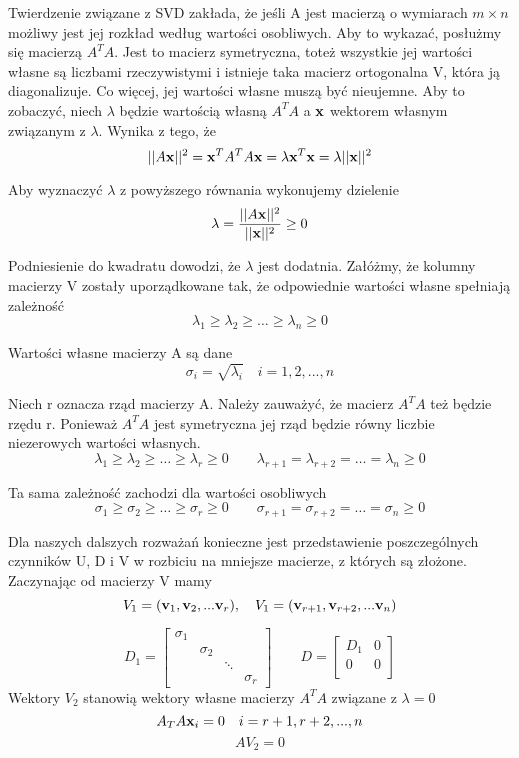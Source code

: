 \documentclass{article}
\begin{document}
Twierdzenie związane z SVD zakłada, że jeśli A jest macierzą o wymiarach $m \times n$ możliwy jest jej rozkład według wartości osobliwych. Aby to wykazać, posłużmy się macierzą $A^T A$. Jest to macierz symetryczna, toteż wszystkie jej wartości własne są liczbami rzeczywistymi i istnieje taka macierz ortogonalna V, która ją diagonalizuje. Co więcej, jej wartości własne muszą być nieujemne. Aby to zobaczyć, niech $\lambda$ będzie wartością własną $A^T A$ a $\vb{x}$ wektorem własnym związanym z $\lambda$. Wynika z tego, że
\[||A \vb{x}||^2 = \vb{x}^{T}A^T A\vb{x} = \lambda\vb{x}^T \vb{x} = \lambda||\vb{x}||^2 \]

Aby wyznaczyć $\lambda$ z powyższego równania wykonujemy dzielenie
\[\lambda = \frac{||A\vb{x}||^2}{||\vb{x}||^2} \geq 0 \]

Podniesienie do kwadratu dowodzi, że $\lambda$ jest dodatnia. Załóżmy, że kolumny macierzy V zostały uporządkowane tak, że odpowiednie wartości własne spełniają zależność
\[\lambda_1 \geq \lambda_2 \geq \ldots \geq \lambda_n \geq 0 \]

Wartości własne macierzy A są dane
\[\sigma_i = \sqrt{\lambda_i} \quad i = 1, 2,..., n \]

Niech r oznacza rząd macierzy A. Należy zauważyć, że macierz $A^T A$ też będzie rzędu r. Ponieważ $A^T A$ jest symetryczna jej rząd będzie równy liczbie niezerowych wartości własnych.
\[\lambda_1 \geq \lambda_2 \geq \ldots \geq \lambda_r \geq 0 \qquad \lambda_{r+1} = \lambda_{r+2} = \ldots = \lambda_n \geq 0 \]

Ta sama zależność zachodzi dla wartości osobliwych
\[\sigma_1 \geq \sigma_2 \geq \ldots \geq \sigma_r \geq 0 \qquad \sigma_{r+1} = \sigma_{r+2} = \ldots = \sigma_n \geq 0 \]

Dla naszych dalszych rozważań konieczne jest przedstawienie poszczególnych czynników U, D i V  w rozbiciu na mniejsze macierze, z których są złożone. Zaczynając od macierzy V mamy
\[V_1 = (\vb{v}_1, \vb{v}_2,... \vb{v}_r), \quad V_1 = (\vb{v}_{r+1}, \vb{v}_{r+2},... \vb{v}_n) \]

\[
D_1 = \begin{bmatrix}
\sigma_1 & & & \\
& \sigma_2 & & \\
& & \ddots & \\
& & & \sigma_r
\end{bmatrix}
\qquad
D = \begin{bmatrix}
D_1 & 0 \\
0 & 0 \\
\end{bmatrix}
\]
Wektory $V_2$ stanowią wektory własne macierzy $A^T A$ związane z $\lambda = 0$
\[A_T A \vb{x}_i = 0 \quad i = r+1, r+2,..., n \]
\[AV_2 = 0 \]
\end{document}
